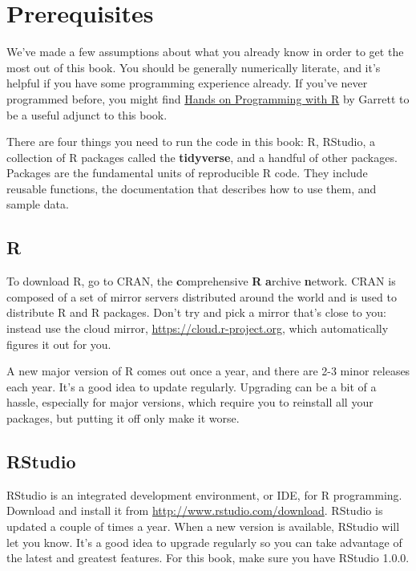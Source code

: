 \documentclass[]{book}
\begin{document}
\section{Prerequisites}\label{prerequisites}

We've made a few assumptions about what you already know in order to get
the most out of this book. You should be generally numerically literate,
and it's helpful if you have some programming experience already. If
you've never programmed before, you might find
\href{http://amzn.com/1449359019}{Hands on Programming with R} by
Garrett to be a useful adjunct to this book.

There are four things you need to run the code in this book: R, RStudio,
a collection of R packages called the \textbf{tidyverse}, and a handful
of other packages. Packages are the fundamental units of reproducible R
code. They include reusable functions, the documentation that describes
how to use them, and sample data.

\subsection{R}\label{r}

To download R, go to CRAN, the \textbf{c}omprehensive \textbf{R}
\textbf{a}rchive \textbf{n}etwork. CRAN is composed of a set of mirror
servers distributed around the world and is used to distribute R and R
packages. Don't try and pick a mirror that's close to you: instead use
the cloud mirror, \url{https://cloud.r-project.org}, which automatically
figures it out for you.

A new major version of R comes out once a year, and there are 2-3 minor
releases each year. It's a good idea to update regularly. Upgrading can
be a bit of a hassle, especially for major versions, which require you
to reinstall all your packages, but putting it off only make it worse.

\subsection{RStudio}\label{rstudio}

RStudio is an integrated development environment, or IDE, for R
programming. Download and install it from
\url{http://www.rstudio.com/download}. RStudio is updated a couple of
times a year. When a new version is available, RStudio will let you
know. It's a good idea to upgrade regularly so you can take advantage of
the latest and greatest features. For this book, make sure you have
RStudio 1.0.0.
\end{document}
